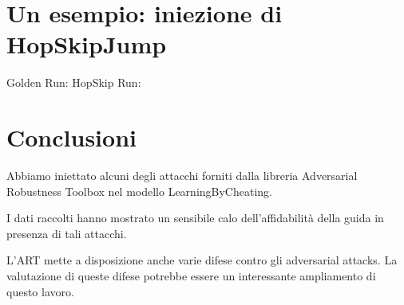 \documentclass{beamer}
\begin{document}
\section{Un esempio: iniezione di HopSkipJump}
\begin{frame}
    
    Golden Run:
    HopSkip Run:
\end{frame}
\section{Conclusioni}
\begin{frame}
    \begin{block}{\vspace*{-3ex}}
            Abbiamo iniettato alcuni degli attacchi forniti dalla libreria Adversarial Robustness Toolbox nel modello
            LearningByCheating.
    \end{block}

    \begin{block}{\vspace*{-3ex}}
        I dati raccolti hanno mostrato un sensibile calo dell'affidabilità della guida in presenza di tali attacchi.
\end{block}

\begin{block}{\vspace*{-3ex}}
    L'ART mette a disposizione anche varie difese contro gli adversarial attacks. La valutazione di queste difese potrebbe essere un interessante
    ampliamento di questo lavoro.

\end{block}
\end{frame}
\end{document}
